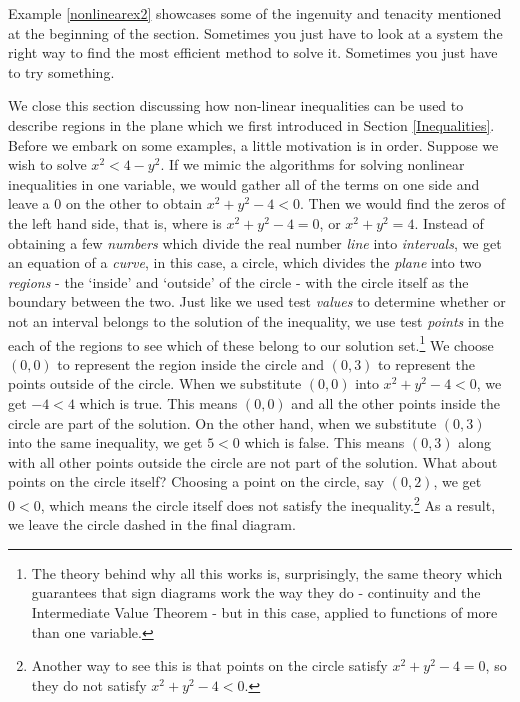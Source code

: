 Example \ref{nonlinearex2} showcases some of the ingenuity and tenacity mentioned at the beginning of the section.  Sometimes you just have to look at a system the right way to find the most efficient method to solve it.  Sometimes you just have to try something.  

\smallskip

We close this section discussing how non-linear inequalities  can be used to describe regions in the plane which we  first introduced in Section \ref{Inequalities}.  Before we embark on some examples,  a little motivation is in order.  Suppose we wish to solve $x^2 < 4 - y^2$.  If we mimic the algorithms for solving nonlinear inequalities in one variable, we would gather all of the terms on one side and leave a $0$ on the other to obtain $x^2 + y^2 -4 < 0$.  Then we would find the zeros of the left hand side, that is, where is $x^2 + y^2 - 4 = 0$, or $x^2 + y^2 = 4$.  Instead of obtaining a few \textit{numbers} which divide the real number \textit{line} into \textit{intervals}, we get an equation of a \textit{curve}, in this case, a circle, which divides the \textit{plane} into two \textit{regions} - the `inside' and `outside' of the circle - with the circle itself as the boundary between the two.  Just like we used test \textit{values} to determine whether or not an interval belongs to the solution of the inequality, we use test \textit{points} in the each of the regions to see which of these belong to our solution set.\footnote{The theory behind why all this works is, surprisingly, the same theory which guarantees that sign diagrams work the way they do - continuity and the Intermediate Value Theorem - but in this case, applied to functions of more than one variable.}  We choose $(0,0)$ to represent the region inside the circle and $(0,3)$ to represent the points outside of the circle. When we substitute $(0,0)$ into $x^2 + y^2 -4 < 0$, we get $-4 < 4$ which is true.  This means $(0,0)$ and all the other points inside the circle are part of the solution.  On the other hand, when we substitute $(0,3)$ into the same inequality, we get $5 < 0$ which is false.  This means $(0,3)$ along with all other points outside the circle are not part of the solution.  What about points on the circle itself?  Choosing a point on the circle, say $(0,2)$, we get $0 < 0$, which means the circle itself does not satisfy the inequality.\footnote{Another way to see this is that points on the circle satisfy $x^2 + y^2 - 4 = 0$, so they do not satisfy $x^2 + y^2 - 4 < 0$.}  As a result, we leave the circle dashed in the final diagram. 

